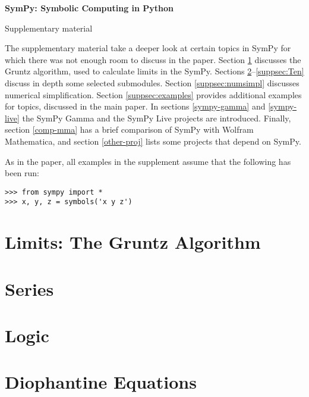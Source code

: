 \documentclass[fleqn,10pt,lineno,numbers]{wlpeerj} %
\begin{document}
\flushbottom
\thispagestyle{empty}%
\vskip-36pt%
{\raggedright\sffamily\bfseries\fontsize{20}{25}\selectfont SymPy: Symbolic Computing in Python\par}%
\vskip10pt
{\raggedright\sffamily\fontsize{12}{16}\selectfont  Supplementary material\par}
\vskip25pt%

The supplementary material take a deeper look at certain topics in SymPy for
which there was not enough room to discuss in the paper.
Section \ref{suppsec:Gruntz} discusses the Gruntz algorithm, used to
calculate limits in the SymPy.  Sections \ref{suppsec:Series}--\ref{suppsec:Ten}
discuss in depth some selected submodules.  Section \ref{suppsec:numsimpl}
discusses numerical simplification.  Section \ref{suppsec:examples} provides
additional examples for topics, discussed in the main paper.  In sections
\ref{sympy-gamma} and \ref{sympy-live} the SymPy Gamma
and the SymPy Live projects are introduced.  Finally, section \ref{comp-mma}
has a
brief comparison of SymPy with Wolfram Mathematica, and
section \ref{other-proj} lists some projects that depend on SymPy.

As in the paper, all examples in the supplement assume that the following
has been run:
\begin{verbatim}
>>> from sympy import *
>>> x, y, z = symbols('x y z')
\end{verbatim}


\section{Limits: The Gruntz Algorithm}
\label{suppsec:Gruntz}


\section{Series}
\label{suppsec:Series}


\section{Logic}
\label{suppsec:Logic}


\section{Diophantine Equations}
\label{suppsec:Dioph}

\end{document}
